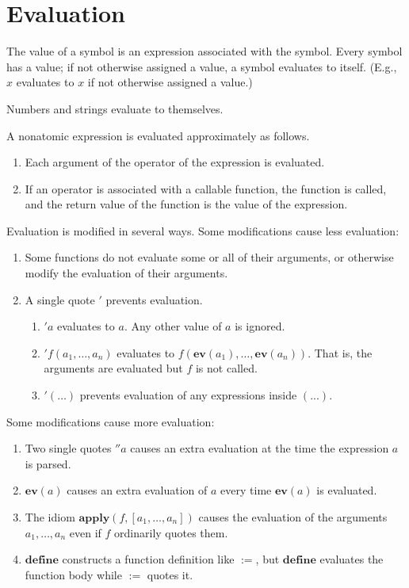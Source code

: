 \documentclass[12pt,leqno]{article}
\begin{document}
\section{Evaluation}

The value of a symbol is an expression associated with the symbol.
Every symbol has a value;
if not otherwise assigned a value, a symbol evaluates to itself.
(E.g., $x$ evaluates to $x$ if not otherwise assigned a value.)

Numbers and strings evaluate to themselves.

A nonatomic expression is evaluated approximately as follows.

\begin{enumerate}
\item Each argument of the operator of the expression is evaluated.
\item If an operator is associated with a callable function, the function is called,
and the return value of the function is the value of the expression.
\end{enumerate}

Evaluation is modified in several ways.
Some modifications cause less evaluation:

\begin{enumerate}
\item Some functions do not evaluate some or all of their arguments,
    or otherwise modify the evaluation of their arguments.
\item A single quote $'$ prevents evaluation.
    \begin{enumerate}
    \item $'a$ evaluates to $a$. Any other value of $a$ is ignored.
    \item $'f(a_1, \ldots, a_n)$ evaluates to $f(\mathbf{ev}(a_1), \ldots, \mathbf{ev}(a_n))$.
        That is, the arguments are evaluated but $f$ is not called.
    \item $'(\ldots)$ prevents evaluation of any expressions inside $(...)$.
    \end{enumerate}
\end{enumerate}

Some modifications cause more evaluation:

\begin{enumerate}
\item Two single quotes $''a$ causes an extra evaluation at the time the expression $a$ is parsed.
\item $\mathbf{ev}(a)$ causes an extra evaluation of $a$ every time $\mathbf{ev}(a)$ is evaluated.
\item The idiom $\mathbf{apply}(f, [a_1, \ldots, a_n])$ causes the evaluation
    of the arguments $a_1, \ldots, a_n$ even if $f$ ordinarily quotes them.
\item $\mathbf{define}$ constructs a function definition like $\mathbf{:=}$,
    but $\mathbf{define}$ evaluates the function body while $\mathbf{:=}$ quotes it.
\end{enumerate}
\end{document}
